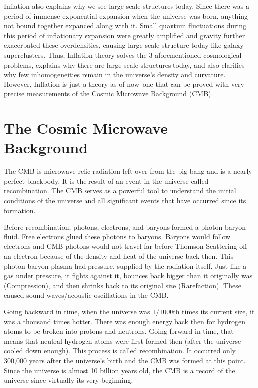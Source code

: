 \documentclass[12pt]{article}
\begin{document}
Inflation also explains why we see large-scale structures today. Since there was a period of immense exponential expansion when the universe was born, anything not bound together expanded along with it. Small quantum fluctuations during this period of inflationary expansion were greatly amplified and gravity further exacerbated these overdensities, causing large-scale structure today like galaxy superclusters. Thus, Inflation theory solves the 3 aforementioned cosmological problems, explains why there are large-scale structures today, and also clarifies why few inhomogeneities remain in the universe’s density and curvature. However, Inflation is just a theory as of now–one that can be proved with very precise measurements of the Cosmic Microwave Background (CMB).

\section{The Cosmic Microwave Background}
The CMB is microwave relic radiation left over from the big bang and is a nearly perfect blackbody. It is the result of an event in the universe called recombination. The CMB serves as a powerful tool to understand the initial conditions of the universe and all significant events that have occurred since its formation.

Before recombination, photons, electrons, and baryons formed a photon-baryon fluid. Free electrons glued these photons to baryons. Baryons would follow electrons and CMB photons would not travel far before Thomson Scattering off an electron because of the density and heat of the universe back then. This photon-baryon plasma had pressure, supplied by the radiation itself. Just like a gas under pressure, it fights against it, bounces back bigger than it originally was (Compression), and then shrinks back to its original size (Rarefaction). These caused sound waves/acoustic oscillations in the CMB.

Going backward in time, when the universe was 1/1000th times its current size, it was a thousand times hotter. There was enough energy back then for hydrogen atoms to be broken into protons and neutrons. Going forward in time, that means that neutral hydrogen atoms were first formed then (after the universe cooled down enough). This process is called recombination. It occurred only 300,000 years after the universe’s birth and the CMB was formed at this point. Since the universe is almost 10 billion years old, the CMB is a record of the universe since virtually its very beginning.
\end{document}
